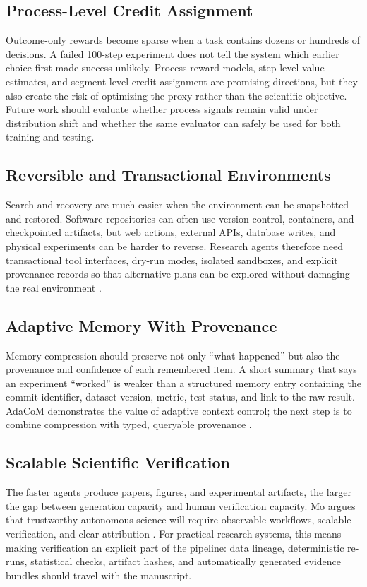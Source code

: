 \documentclass[manuscript,screen]{acmart}
\begin{document}
\subsection{Process-Level Credit Assignment}
Outcome-only rewards become sparse when a task contains dozens or hundreds of decisions. A failed 100-step experiment does not tell the system which earlier choice first made success unlikely. Process reward models, step-level value estimates, and segment-level credit assignment are promising directions, but they also create the risk of optimizing the proxy rather than the scientific objective. Future work should evaluate whether process signals remain valid under distribution shift and whether the same evaluator can safely be used for both training and testing.

\subsection{Reversible and Transactional Environments}
Search and recovery are much easier when the environment can be snapshotted and restored. Software repositories can often use version control, containers, and checkpointed artifacts, but web actions, external APIs, database writes, and physical experiments can be harder to reverse. Research agents therefore need transactional tool interfaces, dry-run modes, isolated sandboxes, and explicit provenance records so that alternative plans can be explored without damaging the real environment \cite{zhou2023lats,zhao2026scienceflow}.

\subsection{Adaptive Memory With Provenance}
Memory compression should preserve not only ``what happened'' but also the provenance and confidence of each remembered item. A short summary that says an experiment ``worked'' is weaker than a structured memory entry containing the commit identifier, dataset version, metric, test status, and link to the raw result. AdaCoM demonstrates the value of adaptive context control; the next step is to combine compression with typed, queryable provenance \cite{yi2026adacom}.

\subsection{Scalable Scientific Verification}
The faster agents produce papers, figures, and experimental artifacts, the larger the gap between generation capacity and human verification capacity. Mo argues that trustworthy autonomous science will require observable workflows, scalable verification, and clear attribution \cite{mo2026trustscience}. For practical research systems, this means making verification an explicit part of the pipeline: data lineage, deterministic re-runs, statistical checks, artifact hashes, and automatically generated evidence bundles should travel with the manuscript.
\end{document}
